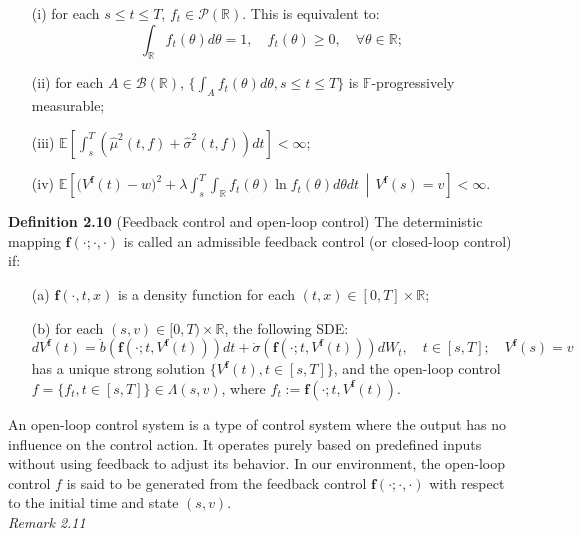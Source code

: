 \documentclass[oneside, a4paper, onecolumn, 11pt]{article}
\begin{document}
\begin{itemize}
    \item[(i)] for each \(s \leq t  \leq T\), \(f_t \in \mathcal{P}(\mathbb{R})\). This is equivalent to:
$$ \int_{\mathbb{R}} f_t(\theta) d\theta = 1, \quad f_t(\theta)  \geq 0,  \quad \forall \theta \in  \mathbb{R};$$
    \item[(ii)] for each \(A \in \mathcal{B}(\mathbb{R})\), \(\{\int_A f_t(\theta) d\theta, s \leq t \leq T\}\) is \(\mathbb{F}\)-progressively measurable;
    \item[(iii)] \(\mathbb{E}\left[\int_s^T (\hat{\mu}^2(t,{f}) + \hat{\sigma}^2(t,f)) dt\right] < \infty;\)
    \item[(iv)] \(\mathbb{E}\left[\big(V^{\boldsymbol{f}}(t) - w\big)^2 + \lambda \int_s^T \int_{\mathbb{R}} f_t(\theta) \ln f_t(\theta) d\theta dt \,\middle|\, V^{\boldsymbol{f}}(s) = v\right] < \infty.\)
\end{itemize}   
\textbf{Definition 2.10} (Feedback control and open-loop control) \cite{WangZhou2020}  
The deterministic mapping $\boldsymbol{f}(\cdot;\cdot,\cdot)$ is called an admissible feedback control (or closed-loop control) if:  
\begin{itemize}
    \item[(a)] $\boldsymbol{f}(\cdot, t, x)$ is a density function for each $(t,x) \in [0,T] \times \mathbb{R}$;
    \item[(b)] for each $(s,v) \in [0,T)\times \mathbb{R}$, the following SDE:  
    \begin{equation}
        dV^{\boldsymbol{f}}(t)= \dot{b}(\boldsymbol{f}(\cdot;t, V^{\boldsymbol{f}}(t)))dt + \dot{\sigma}(\boldsymbol{f}(\cdot;t, V^{\boldsymbol{f}}(t)))dW_t, \quad t \in[s,T]; \quad V^{\boldsymbol{f}}(s) = v
    \end{equation}  
    has a unique strong solution $\{V^{\boldsymbol{f}}(t), t\in [s,T]\}$, and the open-loop control \\$f= \{f_t, t\in[s,T]\} \in \Lambda(s,v)$, where $f_t := \boldsymbol{f}(\cdot;t,V^{\boldsymbol{f}}(t))$.
\end{itemize}  
An open-loop control system is a type of control system where the output has no influence on the control action. It operates purely based on predefined inputs without using feedback to adjust its behavior. In our environment, the open-loop control $f$ is said to be generated from the feedback control 
$\boldsymbol{f}(\cdot; \cdot,\cdot)$ with respect to the initial time and state $(s,v)$.
\\
\textit{Remark 2.11}
\end{document}
